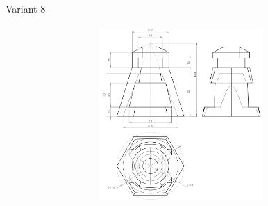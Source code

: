 \documentclass[aspectratio=169]{beamer}
\newcommand{\fbckg}[1]{\usebackgroundtemplate{\texttt{[image: \#1]}}}%
\begin{document}
\begin{frame}[t]{Variant 8}
    \framesubtitle{}
    \vspace{-0.5cm}
    \begin{figure}[H]
        \centering\includegraphics[height=6.5cm,width=1\textwidth,keepaspectratio]{8.png}
        \label{fig:8.png}
    \end{figure}
\end{frame}


\fbckg{fibeamer/figs/last_page.png}
\frame[plain]{}
\end{document}
